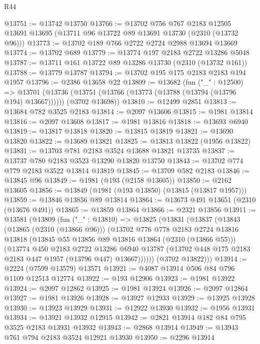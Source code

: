 \begin{lexlean}{R44}
\begin{coremodule}
@13751 := @13742 @13750
@13766 := @13702
    @756
    @767
    @2183
    @12505
    @13691
    @13695
    (@13711 @96 @13722 @89 @13691 @13730 (@2310 (@13732 @96)))
@13773 := @13702 @189 @766 @2722 @2724 @2988 @13694 @13669
@13774 := @13702 @689
@13779 := @13774 @197 @2183 @2722 @13286 @5048
@13787 := @13711 @161 @13722 @89 @13286 @13730 (@2310 (@13732 @161))
@13788 := @13779 @13787
@13794 := @13702 @195 @175 @2183 @2183 @194 @1957
@13796 := @2386 @13658 @22
@13809 := @13682
    (fun ("_" : @12500) =>
    @13701
      (@13736 (@13751 (@13766 (@13773 (@13788 (@13794 (@13796 @194) @13667))))))
      (@3702 @13698))
@13810 := @12499 @2851
@13813 := @13684 @782 @3525 @2183
@13814 := @2097 @13606
@13815 := @1981 @13814
@13816 := @2097 @13608
@13817 := @1981 @13816
@13818 := @13693 @6940
@13819 := @13817 @13818
@13820 := @13815 @13819
@13821 := @13690 @13820
@13822 := @13689 @13821
@13825 := @13813 @13822 (@1956 @13822)
@13831 := @13703 @781 @2183 @3524 @13688 @13821 @13735
@13837 := @13737 @780 @2183 @3523 @13290 @13820 @13750
@13843 := @13702 @774 @779 @2183 @3522 @13814 @13819
@13845 := @13709 @582 @2183
@13846 := @13845 @96
@13849 := @1981 (@193 (@2158 @13605))
@13850 := @2162 @13605
@13856 := @13849 (@1981 (@193 @13850) (@13815 (@13817 @1957)))
@13859 := @13846 @13856 @89 @13814
@13864 := @13673 @491 @13651 (@2310 (@13676 @491))
@13865 := @13859 @13864
@13866 := @2321 @13856
@13911 := @13581
    (@13809
      (fun ("_" : @13810) =>
      @13825
        (@13831
          (@13837
            (@13843
              (@13865 (@2310 (@13866 @96)))
              (@13702
                @776
                @778
                @2183
                @2724
                @13816
                @13818
                (@13845 @55 @13856 @89 @13816 @13864 (@2310 (@13866 @55)))
                (@13774
                  @450
                  @2183
                  @2722
                  @13286
                  @6940
                  @13787
                  (@13702 @448 @175 @2183 @2183 @447 @1957 (@13796 @447) @13667))))))
        (@3702 @13822)))
@13914 := @2224 (@7599 @13579) @13571
@13921 := @4087 @13914 @506 @84 @796 @1109 @12513 @12774
@13922 := @193 @12906
@13923 := @1981 @13922
@13924 := @2097 @12862
@13925 := @1981 @13924
@13926 := @2097 @12864
@13927 := @1981 @13926
@13928 := @13927 @12933
@13929 := @13925 @13928
@13930 := @13923 @13929
@13931 := @12922 @13930
@13932 := @1956 @13931
@13934 := @13921 @13932 @12915
@13942 := @2821 @13914 @182 @84 @795 @3525 @2183 @13931 @13932
@13943 := @2868 @13914
@13949 := @13943 @761 @794 @2183 @3524 @12921 @13930
@13950 := @2296 @13914

\end{coremodule}
\end{lexlean}
